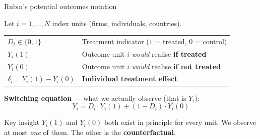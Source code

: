 \documentclass[aspectratio=169, 10pt]{beamer}
\begin{document}
\begin{frame}{Rubin's potential outcomes notation}

  Let $i = 1, \ldots, N$ index units (firms, individuals, countries).

  \bigskip
  \begin{tabular}{ll}
    $D_i \in \{0,1\}$ & Treatment indicator ($1$ = treated, $0$ = control) \\[4pt]
    $Y_i(1)$ & Outcome unit $i$ \emph{would} realise \textbf{if treated} \\[4pt]
    $Y_i(0)$ & Outcome unit $i$ \emph{would} realise \textbf{if not treated} \\[4pt]
    $\delta_i = Y_i(1) - Y_i(0)$ & \textbf{Individual treatment effect} \\
  \end{tabular}

  \bigskip
  \textbf{Switching equation} — what we actually observe (that is $Y_i$):
  \[
    Y_i = D_i \cdot Y_i(1) + (1 - D_i) \cdot Y_i(0)
  \]

  \bigskip
  \begin{alertblock}{Key insight}
    $Y_i(1)$ and $Y_i(0)$ both exist in principle for every unit.
    We observe at most \emph{one} of them. The other is the \textbf{counterfactual}.
  \end{alertblock}
\end{frame}

\end{document}
